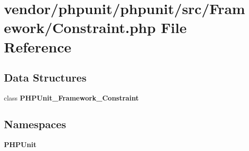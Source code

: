 \section{vendor/phpunit/phpunit/src/\+Framework/\+Constraint.php File Reference}
\label{_constraint_8php}
\subsection*{Data Structures}
\begin{DoxyCompactItemize}
\item 
class {\bf P\+H\+P\+Unit\+\_\+\+Framework\+\_\+\+Constraint}
\end{DoxyCompactItemize}
\subsection*{Namespaces}
\begin{DoxyCompactItemize}
\item 
 {\bf P\+H\+P\+Unit}
\end{DoxyCompactItemize}
